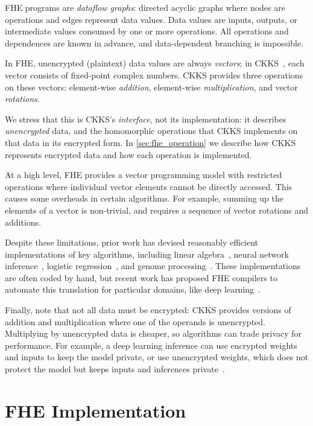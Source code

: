 FHE programs are \emph{dataflow graphs}: directed acyclic graphs where nodes
are operations and edges represent data values. Data values are inputs,
outputs, or intermediate values consumed by one or more operations. All
operations and dependences are known in advance, and data-dependent branching
is impossible.

In FHE, unencrypted (plaintext) data values are always \emph{vectors}; in
CKKS~\cite{brakerski:toct14:leveled}, each vector consists of fixed-point
complex numbers. CKKS provides three operations on these vectors: element-wise
\emph{addition}, element-wise \emph{multiplication}, and vector
\emph{rotations}.

We stress that this is CKKS's \emph{interface}, not its implementation: it
describes \emph{unencrypted} data, and the homomorphic operations that CKKS
implements on that data in its encrypted form.  In \autoref{sec:fhe_operation}
we describe how CKKS represents encrypted data and how each operation is
implemented.

At a high level, FHE provides a vector programming model with restricted
operations where individual vector elements cannot be directly accessed.  This
causes some overheads in certain algorithms. For example, summing up the
elements of a vector is non-trivial, and requires a sequence of vector
rotations and additions.

Despite these limitations, prior work has devised reasonably efficient
implementations of key algorithms, including linear
algebra~\cite{halevi:crypto14:algorithms}, neural network
inference~\cite{brutzkus:icml19:low, gilad:icml16:cryptonets}, logistic
regression~\cite{han:iacr18:efficient}, and genome
processing~\cite{blatt:nas20:secure}. These implementations are often coded by
hand, but recent work has proposed FHE compilers to automate this translation
for particular domains, like deep
learning~\cite{dathathri:pldi19:chet,dathathri:pldi20:eva}.

Finally, note that not all data must be encrypted: CKKS provides versions of
addition and multiplication where one of the operands is unencrypted.
Multiplying by unencrypted data is cheaper, so algorithms can trade privacy for
performance. For example, a deep learning inference can use encrypted weights
and inputs to keep the model private, or use unencrypted weights, which does
not protect the model but keeps inputs and inferences
private~\cite{brutzkus:icml19:low}.

\section{FHE Implementation}
\label{sec:fhe_operation}

